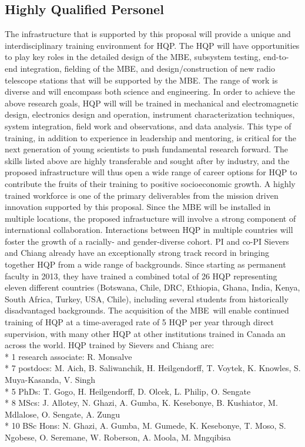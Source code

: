 \documentclass[letterpaper,11pt,preprint]{aastex}
\newcommand{\mbe}{{\rm MBE}}
\begin{document}
\subsection{Highly Qualified Personel}


The infrastructure that is supported by this proposal will provide a
unique and interdisciplinary training environment for HQP.  The HQP
will have opportunities to play key roles in the detailed design of
the \mbe, subsystem testing, end-to-end integration, fielding of the
\mbe, and design/construction of new radio telescope stations that will
be supported by the \mbe.  The range of work is diverse and will
encompass both science and engineering.  In order to achieve the above
research goals, HQP will will be trained in mechanical and
electromagnetic design, electronics design and operation, instrument
characterization techniques, system integration, field work and
observations, and data analysis.  This type of training, in addition
to experience in leadership and mentoring, is critical for the next
generation of young scientists to push fundamental research forward.
The skills listed above are highly transferable and sought after by
industry, and the proposed infrastructure will thus open a wide range
of career options for HQP to contribute the fruits of their training
to positive socioeconomic growth.  A highly trained workforce is one
of the primary deliverables from the mission driven innovation
supported by this proposal.  
Since the MBE will be installed in multiple locations, the proposed
infrastucture will involve a strong component of international
collaboration.  Interactions between HQP in multiple countries will
foster the growth of a racially- and gender-diverse cohort.  PI and
co-PI Sievers and Chiang already have an exceptionally strong track
record in bringing together HQP from a wide range of backgrounds.
Since starting as permanent faculty in 2013, they have trained a combined total of 26 HQP representing eleven
different countries (Botswana, Chile, DRC, Ethiopia, Ghana, India, Kenya, South
Africa, Turkey, USA, Chile), including several students from historically
disadvantaged backgrounds.  The acquisition of the \mbe\ will enable
continued training of HQP at a time-averaged rate of 5 HQP per year
through direct supervision, with many other HQP at other institutions
trained in Canada an across the world.  HQP trained by Sievers and
Chiang are: \\
* 1 research associate: R. Monsalve \\
* 7 postdocs: M. Aich, B. Saliwanchik, H. Heilgendorff, T. Voytek, K. Knowles, S. Muya-Kasanda, V. Singh \\
* 5 PhDs: T. Gogo, H. Heilgendorff, D. Olcek, L. Philip, O. Sengate \\
* 8 MScs: J. Allotey, N. Ghazi, A. Gumba, K. Kesebonye, B. Kushiator, M. Mdlalose, O. Sengate, A. Zungu \\
* 10 BSc Hons: N. Ghazi, A. Gumba, M. Gumede, K. Kesebonye, T. Moso, S. Ngobese, O. Seremane, W. Roberson, A. Moola, M. Mngqibisa \\
\end{document}
